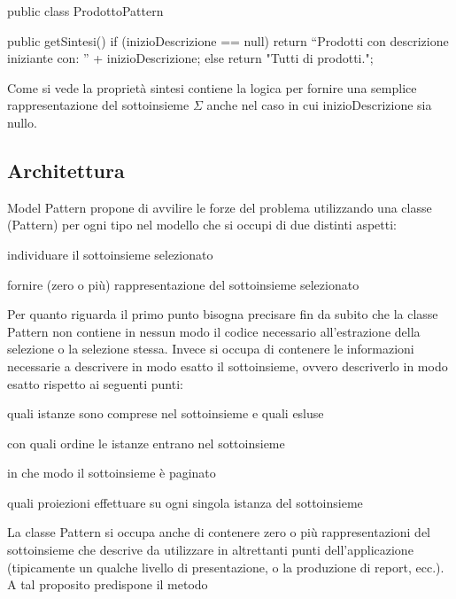 \begin{java}
public class ProdottoPattern  {
    
    public getSintesi()
    {
       if (inizioDescrizione == null)
       {
          return ``Prodotti con descrizione iniziante con: '' +  inizioDescrizione;
       }
       else
       {
          return "Tutti di prodotti.";
       }
    }

}
\end{java} 

Come si vede la proprietà sintesi contiene la logica per fornire una semplice rappresentazione del sottoinsieme $\Sigma$ anche nel caso in cui inizioDescrizione sia nullo.



\subsection{Architettura}
Model Pattern propone di avvilire le forze del problema utilizzando una classe (Pattern) per ogni tipo nel modello che si occupi di due distinti aspetti:
\begin{enumerate*}
  \item individuare il sottoinsieme selezionato
  \item fornire (zero o più) rappresentazione del sottoinsieme selezionato
\end{enumerate*}

Per quanto riguarda il primo punto bisogna precisare fin da subito che la classe Pattern non contiene in nessun modo il codice necessario all'estrazione della selezione o la selezione stessa. Invece si occupa di contenere le informazioni necessarie a descrivere in modo esatto il sottoinsieme,  ovvero descriverlo in modo esatto rispetto ai seguenti punti:

\begin{enumerate*}
\item quali istanze sono comprese nel sottoinsieme e quali esluse
\item con quali ordine le istanze entrano nel sottoinsieme
\item in che modo il sottoinsieme è paginato
\item quali proiezioni effettuare su ogni singola istanza del sottoinsieme
\end{enumerate*}

La classe Pattern si occupa anche di contenere zero o più rappresentazioni del sottoinsieme che descrive da utilizzare in altrettanti punti dell'applicazione (tipicamente un qualche livello di presentazione, o la produzione di report, ecc.). A tal proposito predispone  il metodo

